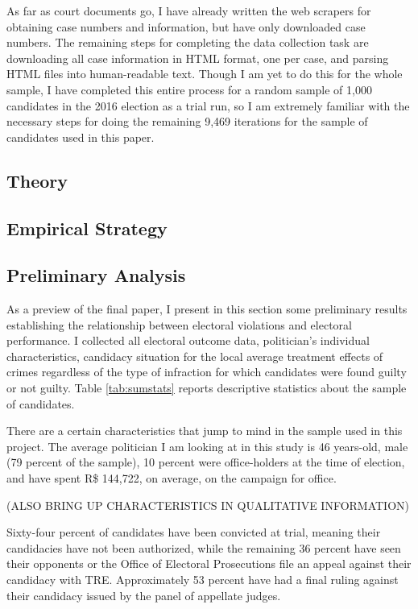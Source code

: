 \documentclass[11pt]{article}
\begin{document}
As far as court documents go, I have already written the web scrapers for obtaining case numbers and information, but have only downloaded case numbers. The remaining steps for completing the data collection task are downloading all case information in HTML format, one per case, and parsing HTML files into human-readable text. Though I am yet to do this for the whole sample, I have completed this entire process for a random sample of 1,000 candidates in the 2016 election as a trial run, so I am extremely familiar with the necessary steps for doing the remaining 9,469 iterations for the sample of candidates used in this paper.

\subsection{Theory} \label{subsec:theory_paper1}

\subsection{Empirical Strategy} \label{subsec:methods_paper1}

\subsection{Preliminary Analysis} \label{subsec:results_paper1}

As a preview of the final paper, I present in this section some preliminary results establishing the relationship between electoral violations and electoral performance. I collected all electoral outcome data, politician's individual characteristics, candidacy situation for the local average treatment effects of crimes regardless of the type of infraction for which candidates were found guilty or not guilty. Table \ref{tab:sumstats} reports descriptive statistics about the sample of candidates.



There are a certain characteristics that jump to mind in the sample used in this project. The average politician I am looking at in this study is 46 years-old, male (79 percent of the sample), 10 percent were office-holders at the time of election, and have spent R\$ 144,722, on average, on the campaign for office.

(ALSO BRING UP CHARACTERISTICS IN QUALITATIVE INFORMATION)

Sixty-four percent of candidates have been convicted at trial, meaning their candidacies have not been authorized, while the remaining 36 percent have seen their opponents or the Office of Electoral Prosecutions file an appeal against their candidacy with TRE. Approximately 53 percent have had a final ruling against their candidacy issued by the panel of appellate judges.
\end{document}
